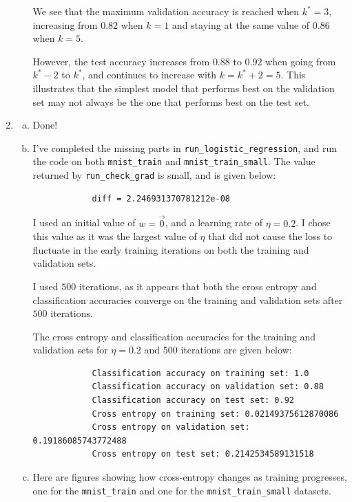 \documentclass{article}
\begin{document}
\begin{enumerate}[3.1]
\begin{enumerate}[(a)]
        We see that the maximum validation accuracy is reached when $k^* = 3$, increasing from 0.82 when $k = 1$ and staying at the same value of 0.86 when $k = 5$.
        
        However, the test accuracy increases from $0.88$ to $0.92$ when going from $k^* - 2$ to $k^*$, and continues to increase with $k = k^* + 2 = 5$. This illustrates that the simplest model that performs best on the validation set may not always be the one that performs best on the test set. 
    \end{enumerate}
    
    \item \begin{enumerate}[(a)]
        \item Done!
        \item I've completed the missing parts in \texttt{run\_logistic\_regression}, and run the code on both \texttt{mnist\_train} and \texttt{mnist\_train\_small}. The value returned by \texttt{run\_check\_grad} is small, and is given below:
        
        \begin{verbatim}
            diff = 2.246931370781212e-08
        \end{verbatim}

        I used an initial value of $w = \vec{0}$, and a learning rate of $\eta = 0.2$. I chose this value as it was the largest value of $\eta$ that did not cause the loss to fluctuate in the early training iterations on both the training and validation sets.

        I used $500$ iterations, as it appears that both the cross entropy and classification accuracies converge on the training and validation sets after $500$ iterations.

        The cross entropy and classification accuracies for the training and validation sets for $\eta = 0.2$ and $500$ iterations are given below:

        \begin{verbatim}
            Classification accuracy on training set: 1.0
            Classification accuracy on validation set: 0.88
            Classification accuracy on test set: 0.92
            Cross entropy on training set: 0.02149375612870086
            Cross entropy on validation set: 0.19186085743772488
            Cross entropy on test set: 0.2142534589131518
        \end{verbatim}

        \item Here are figures showing how cross-entropy changes as training progresses, one for the \texttt{mnist\_train} and one for the \texttt{mnist\_train\_small} datasets.
        

\end{enumerate}
\end{enumerate}
\end{document}
